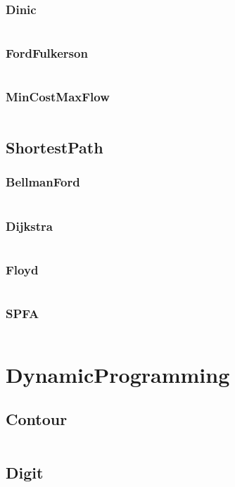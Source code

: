 \documentclass[a4paper,11pt]{article}
\begin{document}
\subsubsection{Dinic}
\inputminted[breaklines]{c++}{04++GraphTheory/+NetworkFlow/+Dinic.cpp}
\subsubsection{FordFulkerson}
\inputminted[breaklines]{c++}{04++GraphTheory/+NetworkFlow/+FordFulkerson.cpp}
\subsubsection{MinCostMaxFlow}
\inputminted[breaklines]{c++}{04++GraphTheory/+NetworkFlow/+MinCostMaxFlow.cpp}

\subsection{ShortestPath}
\subsubsection{BellmanFord}
\inputminted[breaklines]{c++}{04++GraphTheory/+ShortestPath/+BellmanFord.cpp}
\subsubsection{Dijkstra}
\inputminted[breaklines]{c++}{04++GraphTheory/+ShortestPath/+Dijkstra.cpp}
\subsubsection{Floyd}
\inputminted[breaklines]{c++}{04++GraphTheory/+ShortestPath/+Floyd.cpp}
\subsubsection{SPFA}
\inputminted[breaklines]{c++}{04++GraphTheory/+ShortestPath/+SPFA.cpp}


\newpage
\section{DynamicProgramming}
\subsection{Contour}
\inputminted[breaklines]{c++}{05++DynamicProgramming/+Contour.cpp}
\subsection{Digit}
\inputminted[breaklines]{c++}{05++DynamicProgramming/+Digit.cpp}
\end{document}

